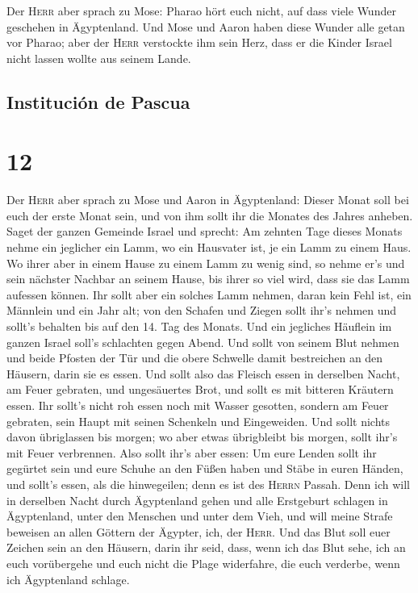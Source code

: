  Der \textsc{Herr} aber sprach zu Mose: Pharao hört euch
nicht, auf dass viele Wunder geschehen in Ägyptenland. 
Und Mose und Aaron haben diese Wunder alle getan vor Pharao; aber der
\textsc{Herr} verstockte ihm sein Herz, dass er die Kinder Israel nicht
lassen wollte aus seinem Lande.

\hypertarget{instituciuxf3n-de-pascua}{%
\subsection{Institución de Pascua}\label{instituciuxf3n-de-pascua}}

\hypertarget{section-11}{%
\section{12}\label{section-11}}

 Der \textsc{Herr} aber sprach zu Mose und Aaron in
Ägyptenland:  Dieser Monat soll bei euch der erste Monat
sein, und von ihm sollt ihr die Monates des Jahres anheben.
 Saget der ganzen Gemeinde Israel und sprecht: Am zehnten
Tage dieses Monats nehme ein jeglicher ein Lamm, wo ein Hausvater ist,
je ein Lamm zu einem Haus.  Wo ihrer aber in einem Hause
zu einem Lamm zu wenig sind, so nehme er's und sein nächster Nachbar an
seinem Hause, bis ihrer so viel wird, dass sie das Lamm aufessen können.
 Ihr sollt aber ein solches Lamm nehmen, daran kein Fehl
ist, ein Männlein und ein Jahr alt; von den Schafen und Ziegen sollt
ihr's nehmen  und sollt's behalten bis auf den 14. Tag des
Monats. Und ein jegliches Häuflein im ganzen Israel soll's schlachten
gegen Abend.  Und sollt von seinem Blut nehmen und beide
Pfosten der Tür und die obere Schwelle damit bestreichen an den Häusern,
darin sie es essen.  Und sollt also das Fleisch essen in
derselben Nacht, am Feuer gebraten, und ungesäuertes Brot, und sollt es
mit bitteren Kräutern essen.  Ihr sollt's nicht roh essen
noch mit Wasser gesotten, sondern am Feuer gebraten, sein Haupt mit
seinen Schenkeln und Eingeweiden.  Und sollt nichts davon
übriglassen bis morgen; wo aber etwas übrigbleibt bis morgen, sollt
ihr's mit Feuer verbrennen.  Also sollt ihr's aber essen:
Um eure Lenden sollt ihr gegürtet sein und eure Schuhe an den Füßen
haben und Stäbe in euren Händen, und sollt's essen, als die hinwegeilen;
denn es ist des \textsc{Herrn} Passah.  Denn ich will in
derselben Nacht durch Ägyptenland gehen und alle Erstgeburt schlagen in
Ägyptenland, unter den Menschen und unter dem Vieh, und will meine
Strafe beweisen an allen Göttern der Ägypter, ich, der \textsc{Herr}.
 Und das Blut soll euer Zeichen sein an den Häusern,
darin ihr seid, dass, wenn ich das Blut sehe, ich an euch vorübergehe
und euch nicht die Plage widerfahre, die euch verderbe, wenn ich
Ägyptenland schlage.

